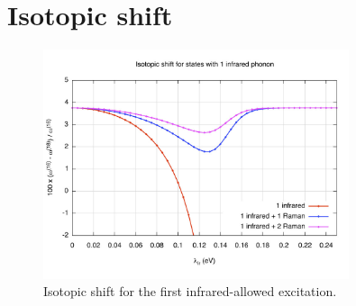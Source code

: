 \section{Isotopic shift}
\label{sec:polaron-isotopic-shift}

\begin{figure}
  \centering
  \includegraphics[width=0.8\textwidth]{images/isot-1ir.jpg}
  \caption{Isotopic shift for the first infrared-allowed excitation.}
  \label{fig:isot-1ir}
\end{figure}

